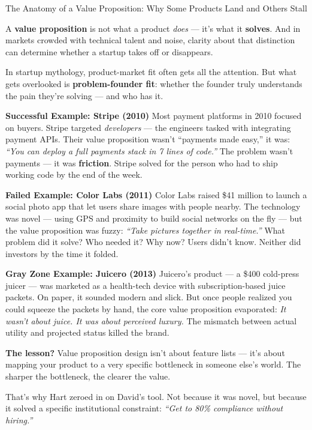 \begin{HistoricalSidebar}{The Anatomy of a Value Proposition: Why Some Products Land and Others Stall}

  A \textbf{value proposition} is not what a product \textit{does} — it's what it \textbf{solves}. And in markets 
  crowded with technical talent and noise, clarity about that distinction can determine whether a startup takes 
  off or disappears.
  
  \medskip
  
  In startup mythology, product-market fit often gets all the attention. But what gets overlooked is \textbf{problem-founder fit}: 
  whether the founder truly understands the pain they’re solving — and who has it.
  
  \medskip
  
  \textbf{Successful Example: Stripe (2010)}  
  Most payment platforms in 2010 focused on buyers. Stripe targeted \textit{developers} — the engineers tasked with integrating 
  payment APIs. Their value proposition wasn’t “payments made easy,” it was:  
  \textit{“You can deploy a full payments stack in 7 lines of code.”}  
  The problem wasn’t payments — it was \textbf{friction}. Stripe solved for the person who had to ship working code by the end 
  of the week.
  
  \medskip
  
  \textbf{Failed Example: Color Labs (2011)}  
  Color Labs raised \$41 million to launch a social photo app that let users share images with people nearby. The technology 
  was novel — using GPS and proximity to build social networks on the fly — but the value proposition was fuzzy:  
  \textit{“Take pictures together in real-time.”}  
  What problem did it solve? Who needed it? Why now? Users didn’t know. Neither did investors by the time it folded.
  
  \medskip
  
  \textbf{Gray Zone Example: Juicero (2013)}  
  Juicero’s product — a \$400 cold-press juicer — was marketed as a health-tech device with subscription-based juice packets. 
  On paper, it sounded modern and slick. But once people realized you could squeeze the packets by hand, the core value 
  proposition evaporated:  
  \textit{It wasn't about juice. It was about perceived luxury.}  
  The mismatch between actual utility and projected status killed the brand.
  
  \medskip
  
  \textbf{The lesson?}  
  Value proposition design isn’t about feature lists — it’s about mapping your product to a very specific bottleneck in someone 
  else’s world. The sharper the bottleneck, the clearer the value.
  
  \medskip
  
  That’s why Hart zeroed in on David’s tool. Not because it was novel, but because it solved a specific institutional constraint:  
  \textit{“Get to 80\% compliance without hiring.”}
  
\end{HistoricalSidebar}


